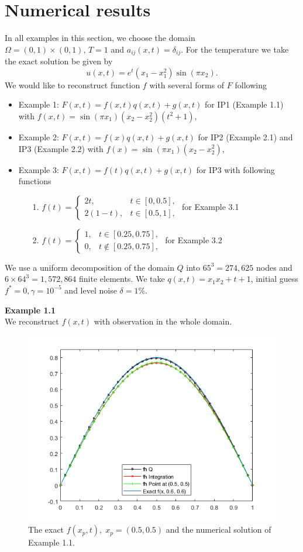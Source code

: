 \documentclass[]{article}
\begin{document}
\section{Numerical results}
In all examples in this section, we choose the domain $\Omega=(0, 1)\times(0, 1),\, T=1$ and $a_{ij}(x, t)=\delta_{ij}$.
For the temperature we take the exact solution be given by
$$u(x, t)=e^t(x_1-x_1^2)\sin(\pi x_2).$$
We would like to reconstruct function $f$ with several forms of $F$ following
\begin{itemize}
	\item Example 1: $F(x, t)=f(x, t)q(x, t)+g(x, t)$ for IP1 (Example 1.1) with $f(x, t)=\sin(\pi x_1)(x_2-x_2^2)(t^2+1)$,
	\item Example 2: $F(x, t)=f(x)q(x, t)+g(x, t)$ for IP2 (Example 2.1) and IP3 (Example 2.2) with $f(x)=\sin(\pi x_1)(x_2-x_2^2)$,
	\item Example 3: $F(x, t)=f(t)q(x, t)+g(x, t)$ for IP3 with following functions
	\begin{itemize}
		\item[1.]$f(t)=
			\begin{cases}
			2t, & t\in [0, 0.5],\\
			2(1-t), & t \in [0.5, 1],
			\end{cases}$ \qquad for Example 3.1
 		\item[2.] $f(t)=
		\begin{cases}
		1, & t\in [0.25, 0.75],\\
		0, & t \notin [0.25, 0.75],
		\end{cases}$ \qquad for Example 3.2
	\end{itemize}
\end{itemize}
We use a uniform decomposition of the domain $Q$ into $65^3=274,625$ nodes and $6\times 64^3=1,572,864$ finite elements. We take $q(x, t)=x_1x_2+t+1$, initial guess $f^*=0, \gamma=10^{-5}$ and level noise $\delta =1\%$.

\newpage
\noindent\textbf{Example 1.1}
\\
We reconstruct $f(x, t)$ with observation in the whole domain.
\begin{figure}[h!]
	\centering
	\includegraphics[width=.5\linewidth]{../FreeFem++/fhx}
	\caption{The exact $f(x_p, t),\; x_p=(0.5, 0.5)$ and the numerical solution of Example 1.1.}
\end{figure}
\end{document}
